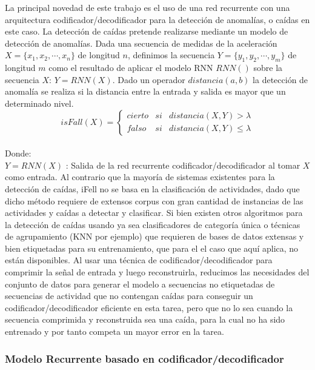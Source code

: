 La principal novedad de este trabajo es el uso de una red recurrente con una arquitectura codificador/decodificador para la detección de anomalías, o caídas en este caso. La detección de caídas pretende realizarse mediante un modelo de detección de anomalías. Dada una secuencia de medidas de la aceleración $X=\{x_1,x_2,\cdots,x_n\}$ de longitud $n$, definimos la secuencia $Y=\{y_1, y_2, \cdots,y_m\}$ de longitud $m$ como el resultado de aplicar el modelo RNN $RNN()$ sobre la secuencia $X$: $Y=RNN(X)$. Dado un operador $distancia(a,b)$ la detección de anomalía se realiza si la distancia entre la entrada y salida es mayor que un determinado nivel. 
\[
  isFall(X)=\left\{
    \begin{array}{lcl}
      cierto & si & distancia(X,Y) > \lambda \\
      falso & si & distancia(X,Y) \leq  \lambda
    \end{array}
    \right.
\]
\\
Donde:\\
$Y = RNN(X)$ : Salida de la red recurrente codificador/decodificador al tomar $X$ como entrada.
Al contrario que la mayoría de sistemas existentes para la detección de caídas, iFell no se basa en la clasificación de actividades, dado que dicho método requiere de extensos corpus con gran cantidad de instancias de las actividades y caídas a detectar y clasificar. Si bien existen otros algoritmos \cite{referencia} para la detección de caídas usando ya sea clasificadores de categoría única o técnicas de agrupamiento (KNN por ejemplo) que requieren de bases de datos extensas y bien etiquetadas para su entrenamiento, que para el el caso que aquí aplica, no están disponibles. Al usar una técnica de codificador/decodificador para comprimir la señal de entrada y luego reconstruirla, reducimos las necesidades del conjunto de datos para generar el modelo a secuencias no etiquetadas de secuencias de actividad que no contengan caídas para conseguir un codificador/decodificador eficiente en esta tarea, pero que no lo sea cuando la secuencia comprimida y reconstruida sea una caída, para la cual no ha sido entrenado y por tanto competa un mayor error en la tarea.

\subsubsection{Modelo Recurrente basado en codificador/decodificador}

